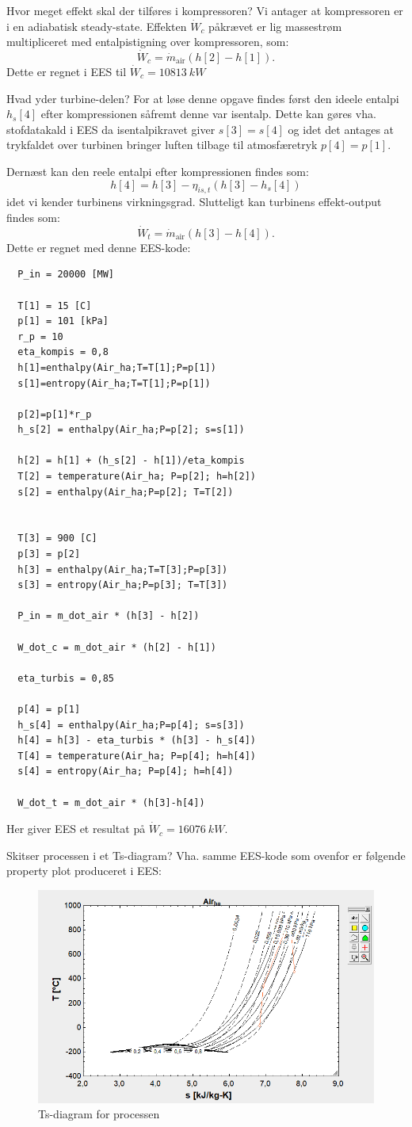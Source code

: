 \documentclass[a4paper]{article}
\begin{document}
 Hvor meget effekt skal der tilføres i kompressoren?
\bigbreak
Vi antager at kompressoren er i en adiabatisk steady-state. Effekten $\dot{W}_c$ påkrævet er lig massestrøm multipliceret med entalpistigning over kompressoren, som:
\[ 
  \dot{W}_c = \dot{m}_{\mathrm{air}} \left( h[2] - h[1] \right)
.\]
Dette er regnet i EES til $\dot{W}_c = \qty{10813}{kW}$


 Hvad yder turbine-delen?
\bigbreak
For at løse denne opgave findes først den ideele entalpi $h_s[4]$ efter kompressionen såfremt denne var isentalp. Dette kan gøres vha. stofdatakald i EES da isentalpikravet giver $s[3] = s[4]$ og idet det antages at trykfaldet over turbinen bringer luften tilbage til atmosfæretryk $p[4]=p[1]$. 

Dernæst kan den reele entalpi efter kompressionen findes som:
\[ 
  h[4]=h[3]-\eta_{is, t} \left( h[3] - h_s[4] \right)
\]
idet vi kender turbinens virkningsgrad. Slutteligt kan turbinens effekt-output findes som:
\[ 
  \dot{W}_t = \dot{m}_{\mathrm{air}} \left( h[3] - h[4] \right)
.\]
Dette er regnet med denne EES-kode:
\begin{verbatim}
  P_in = 20000 [MW]
   
  T[1] = 15 [C]
  p[1] = 101 [kPa]
  r_p = 10
  eta_kompis = 0,8
  h[1]=enthalpy(Air_ha;T=T[1];P=p[1])
  s[1]=entropy(Air_ha;T=T[1];P=p[1])
   
  p[2]=p[1]*r_p
  h_s[2] = enthalpy(Air_ha;P=p[2]; s=s[1])
   
  h[2] = h[1] + (h_s[2] - h[1])/eta_kompis
  T[2] = temperature(Air_ha; P=p[2]; h=h[2])
  s[2] = enthalpy(Air_ha;P=p[2]; T=T[2])
   
   
  T[3] = 900 [C]
  p[3] = p[2]
  h[3] = enthalpy(Air_ha;T=T[3];P=p[3])
  s[3] = entropy(Air_ha;P=p[3]; T=T[3])
   
  P_in = m_dot_air * (h[3] - h[2])
 
  W_dot_c = m_dot_air * (h[2] - h[1])
 
  eta_turbis = 0,85
 
  p[4] = p[1]
  h_s[4] = enthalpy(Air_ha;P=p[4]; s=s[3])
  h[4] = h[3] - eta_turbis * (h[3] - h_s[4])
  T[4] = temperature(Air_ha; P=p[4]; h=h[4])
  s[4] = entropy(Air_ha; P=p[4]; h=h[4])
 
  W_dot_t = m_dot_air * (h[3]-h[4])
\end{verbatim}
Her giver EES et resultat på $\dot{W}_c = \qty{16076}{kW}$. 

 Skitser processen i et Ts-diagram?
\bigbreak
Vha. samme EES-kode som ovenfor er følgende property plot produceret i EES:
\begin{figure} [ht]
  \centering
  \includegraphics[width=0.5\linewidth]{./figures/p2_1.png}
  \caption{Ts-diagram for processen}
  \label{fig:p2_1}
\end{figure}
\end{document}
